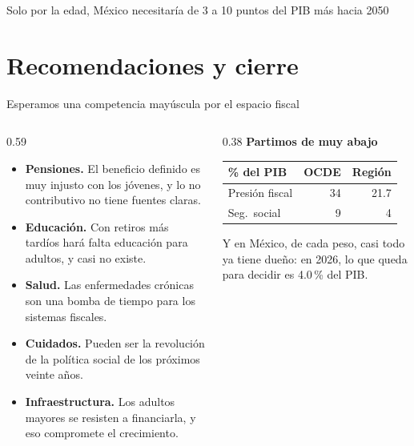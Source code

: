 \documentclass[aspectratio=169,11pt]{beamer}
\begin{document}
\begin{frame}{Solo por la edad, México necesitaría de 3 a 10 puntos del PIB más hacia 2050}
\end{frame}

\section{Recomendaciones y cierre}

\begin{frame}{Esperamos una competencia mayúscula por el espacio fiscal}
  \begin{columns}[T]
    \begin{column}{0.59\textwidth}
      \begin{itemize}
        \item \textbf{Pensiones.} El beneficio definido es muy injusto con los jóvenes, y lo no contributivo no tiene fuentes claras.
        \item \textbf{Educación.} Con retiros más tardíos hará falta educación para adultos, y casi no existe.
        \item \textbf{Salud.} Las enfermedades crónicas son una bomba de tiempo para los sistemas fiscales.
        \item \textbf{Cuidados.} Pueden ser la revolución de la política social de los próximos veinte años.
        \item \textbf{Infraestructura.} Los adultos mayores se resisten a financiarla, y eso compromete el crecimiento.
      \end{itemize}
    \end{column}
    \begin{column}{0.38\textwidth}
      \pause
      \textbf{Partimos de muy abajo}\par\smallskip
      \setlength{\tabcolsep}{3pt}
      \begin{tabular}{@{}lrr@{}}
        \toprule
        \% del PIB & OCDE & Región \\
        \midrule
        Presión fiscal & 34 & 21.7 \\
        Seg.\ social & 9 & 4 \\
        \bottomrule
      \end{tabular}
      \par\medskip
      Y en México, de cada peso, casi todo ya tiene dueño: en 2026, lo que queda para decidir es 4.0\,\% del PIB.

\end{column}
\end{columns}
\end{frame}
\end{document}
